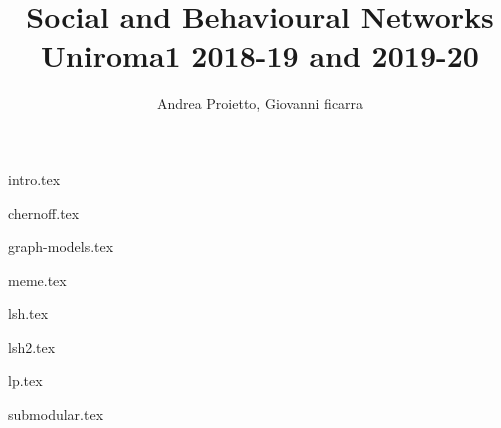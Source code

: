 \documentclass{report}
\title{
    Social and Behavioural Networks \\
    \large Uniroma1 2018-19 and 2019-20
}
\author{Andrea Proietto, Giovanni ficarra}
\begin{document}
\maketitle

\tableofcontents


{intro.tex}

{chernoff.tex}

{graph-models.tex}

{meme.tex}
	
{lsh.tex}

{lsh2.tex}

{lp.tex}

{submodular.tex}



\end{document}
